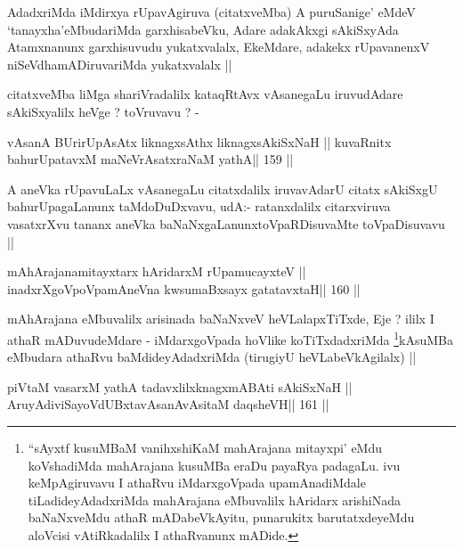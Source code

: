 \begin{artha}
AdadxriMda iMdirxya rUpavAgiruva (citatxveMba) A puruSanige' eMdeV
`tanayxha'eMbudariMda garxhisabeVku, Adare adakAkxgi sAkiSxyAda
Atamxnanunx garxhisuvudu yukatxvalalx, EkeMdare, adakekx rUpavanenxV
niSeVdhamADiruvariMda yukatxvalalx ||
\end{artha}

\begin{artha}
citatxveMba liMga shariVradalilx kataqRtAvx vAsanegaLu iruvudAdare
sAkiSxyalilx heVge ? toVruvavu ? -
\end{artha}

\begin{shl}
vAsanA BUrirUpAsAtx liknagxsAthx liknagxsAkiSxNaH ||
kuvaRnitx bahurUpatavxM maNeVrAsatxraNaM yathA\hfill || 159 ||
\end{shl}

\begin{artha}
A aneVka rUpavuLaLx vAsanegaLu citatxdalilx iruvavAdarU citatx
sAkiSxgU bahurUpagaLanunx taMdoDuDxvavu, udA:- ratanxdalilx
citarxviruva vasatxrXvu tananx aneVka baNaNxgaLanunxtoVpaRDisuvaMte
toVpaDisuvavu ||
\end{artha}

\begin{shl}
mAhArajanamitayxtarx hAridarxM rUpamucayxteV ||
\footnotemark[1]inadxrXgoVpoVpamAneVna kwsumaBxsayx gatatavxtaH\hfill || 160 ||
\end{shl}

\begin{artha}
mAhArajana eMbuvalilx arisinada baNaNxveV heVLalapxTiTxde, Eje ? ililx
I athaR mADuvudeMdare - iMdarxgoVpada hoVlike
koTiTxdadxriMda \footnote[1]{``sAyxtf kusuMBaM vanihxshiKaM mahArajana
mitayxpi' eMdu koVshadiMda mahArajana kusuMBa eraDu payaRya
padagaLu. ivu keMpAgiruvavu I athaRvu iMdarxgoVpada upamAnadiMdale
tiLadideyAdadxriMda mahArajana eMbuvalilx hAridarx arishiNada
baNaNxveMdu athaR mADabeVkAyitu, punarukitx barutatxdeyeMdu aloVcisi
vAtiRkadalilx I athaRvanunx mADide.}kAsuMBa eMbudara athaRvu
baMdideyAdadxriMda (tirugiyU heVLabeVkAgilalx) ||
\end{artha}

\begin{shl}
piVtaM vasarxM yathA tadavxlilxknagxmABAti sAkiSxNaH ||
AruyAdiviSayoVdUBxtavAsanAvAsitaM daqsheVH\hfill || 161 ||
\end{shl}


